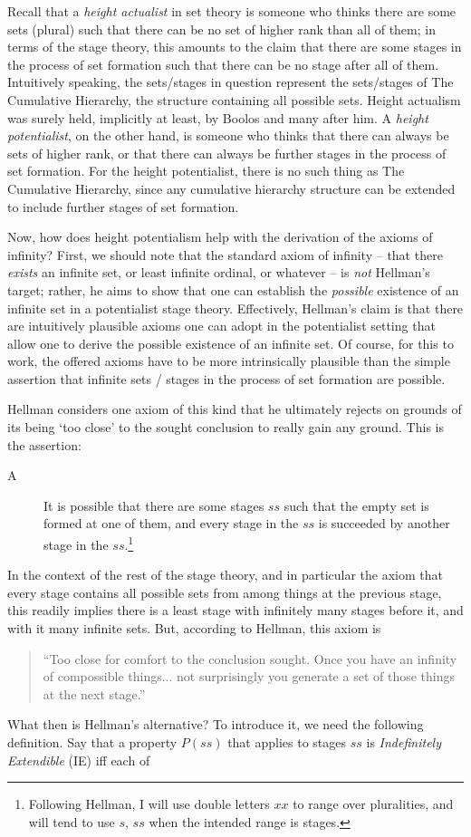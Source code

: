 \documentclass{asl}
\theoremstyle{definition}
\begin{document}
Recall that a \emph{height actualist} in set theory is 
someone who thinks there are some sets (plural) such that 
there can be no set of higher rank than all of them; in 
terms of the stage theory, this amounts to the claim that 
there are some stages in the process of set formation such 
that there can be no stage after all of them. Intuitively 
speaking, the sets/stages in question represent the 
sets/stages of The Cumulative Hierarchy, the structure 
containing all possible sets. Height actualism was surely 
held, implicitly at least, by Boolos and many after him. 
A \emph{height potentialist}, on the other hand, is 
someone who thinks that there can always be sets of 
higher rank, or that there can always be further 
stages in the process of set formation. For 
the height potentialist, there is no such thing as The 
Cumulative Hierarchy, since any cumulative hierarchy 
structure can be extended to include further stages of 
set formation.

Now, how does height potentialism help with the 
derivation of the axioms of infinity? 
First, we should note that the standard axiom of infinity 
-- that there \emph{exists} an infinite set, or 
least infinite ordinal, or whatever -- is \emph{not} 
Hellman's target; rather, he aims to show that one can 
establish the \emph{possible} existence of an infinite 
set in a potentialist stage theory. Effectively, 
Hellman's claim is that there are intuitively 
plausible axioms one can adopt in the potentialist 
setting that allow one to derive the possible 
existence of an infinite set. Of course, for 
this to work, the offered axioms have to be more 
intrinsically plausible than the simple assertion 
that infinite sets / stages in the process of set 
formation are possible.

Hellman considers one axiom of this kind 
that he ultimately rejects on grounds of its being `too close' 
to the sought conclusion to really gain any ground. This is the assertion:
\begin{description}
\item[A] It is possible that there are some stages $ss$ 
such that the empty set is formed at one of them, 
and every stage in the $ss$ is succeeded by another stage in the $ss$.\footnote{
    Following Hellman, I will use double letters $xx$ to range over pluralities, 
    and will tend to use $s$, $ss$ when the intended range is stages.
    }
\end{description}
In the context of the rest of the stage theory, 
and in particular the axiom that every stage contains all possible sets 
from among things at the previous stage,
this readily implies there is a least stage with infinitely many stages before it, 
and with it many infinite sets. But, according to Hellman, this axiom is 
\begin{quote} ``Too close for comfort to the conclusion sought. 
    Once you have an infinity of compossible things... 
    not surprisingly you generate a set of those things at the next stage.''\end{quote}
What then is Hellman's alternative? To introduce it, 
we need the following definition. 
Say that a property $P(ss)$ that applies to stages $ss$ is
 \emph{Indefinitely Extendible} (IE) 
iff each of
\end{document}
